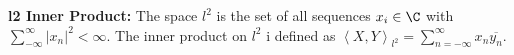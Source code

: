 {\bf l2 Inner Product:} The space $l^2$ is the set of all sequences $x_i\in\C$ with $\sum_{-\infty}^{\infty}|x_n|^2<\infty$. The inner product on $l^2$ i defined as $\left\langle X,Y\right\rangle_{l^2}=\sum_{n=-\infty}^{\infty}x_n\overline{y_n}$.